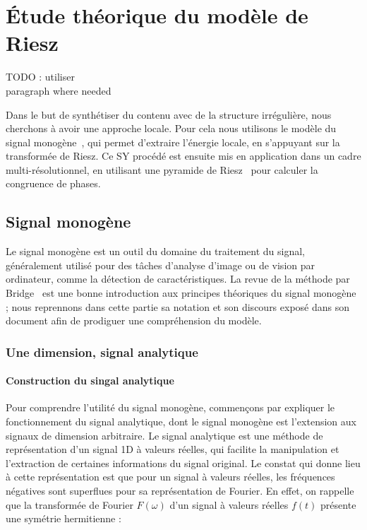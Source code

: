 \chapter[Modèle de Riesz]{Étude théorique du modèle de Riesz} %
\label{chap:chapitre1}

{\color{red} TODO : utiliser \\paragraph where needed}

Dans le but de synthétiser du contenu avec de la structure irrégulière, nous cherchons à avoir une approche locale. Pour cela nous utilisons le modèle du signal monogène~\cite{felsberg_monogenic_2001}, qui permet d'extraire l'énergie locale, en s'appuyant sur la transformée de Riesz. Ce SY procédé est ensuite mis en application dans un cadre multi-résolutionnel, en utilisant une pyramide de Riesz~\cite{wadhwa_riesz_2014} pour calculer la congruence de phases.

\section{Signal monogène}

Le signal monogène est un outil du domaine du traitement du signal, généralement utilisé pour des tâches d'analyse d'image ou de vision par ordinateur, comme la détection de caractéristiques. La revue de la méthode par Bridge~\cite{bridge_introduction_2018} est une bonne introduction aux principes théoriques du signal monogène ; nous reprennons dans cette partie sa notation et son discours exposé dans son document afin de prodiguer une compréhension du modèle.

\subsection{Une dimension, signal analytique}

\subsubsection{Construction du singal analytique}

Pour comprendre l'utilité du signal monogène, commençons par expliquer le fonctionnement du signal analytique, dont le signal monogène est l'extension aux signaux de dimension arbitraire. Le signal analytique est une méthode de représentation d'un signal 1D à valeurs réelles, qui facilite la manipulation et l'extraction de certaines informations du signal original. Le constat qui donne lieu à cette représentation est que pour un signal à valeurs réelles, les fréquences négatives sont superflues pour sa représentation de Fourier. En effet, on rappelle que la transformée de Fourier $F(\omega)$ d'un signal à valeurs réelles $f(t)$ présente une symétrie hermitienne :

